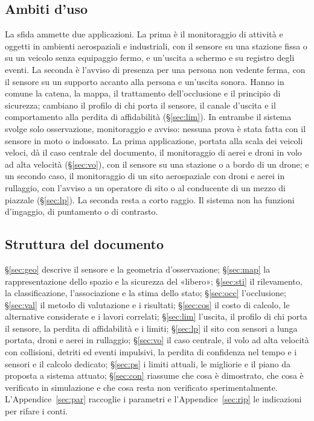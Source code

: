 \subsection{Ambiti d'uso}\label{sec:intro-ambiti}

La sfida ammette due applicazioni. La prima è il monitoraggio di attività e oggetti in ambienti aerospaziali e industriali, con il sensore su una stazione fissa o su un veicolo senza equipaggio fermo, e un'uscita a schermo e su registro degli eventi. La seconda è l'avviso di presenza per una persona non vedente ferma, con il sensore su un supporto accanto alla persona e un'uscita sonora. Hanno in comune la catena, la mappa, il trattamento dell'occlusione e il principio di sicurezza; cambiano il profilo di chi porta il sensore, il canale d'uscita e il comportamento alla perdita di affidabilità (\S\ref{sec:lim}). In entrambe il sistema svolge solo osservazione, monitoraggio e avviso: nessuna prova è stata fatta con il sensore in moto o indossato. La prima applicazione, portata alla scala dei veicoli veloci, dà il caso centrale del documento, il monitoraggio di aerei e droni in volo ad alta velocità (\S\ref{sec:vo}), con il sensore su una stazione o a bordo di un drone; e un secondo caso, il monitoraggio di un sito aerospaziale con droni e aerei in rullaggio, con l'avviso a un operatore di sito o al conducente di un mezzo di piazzale (\S\ref{sec:lp}). La seconda resta a corto raggio. Il sistema non ha funzioni d'ingaggio, di puntamento o di contrasto.

\subsection{Struttura del documento}\label{sec:intro-struttura}

\S\ref{sec:geo} descrive il sensore e la geometria d'osservazione; \S\ref{sec:map} la rappresentazione dello spazio e la sicurezza del «libero»; \S\ref{sec:sti} il rilevamento, la classificazione, l'associazione e la stima dello stato; \S\ref{sec:occ} l'occlusione; \S\ref{sec:val} il metodo di valutazione e i risultati; \S\ref{sec:cos} il costo di calcolo, le alternative considerate e i lavori correlati; \S\ref{sec:lim} l'uscita, il profilo di chi porta il sensore, la perdita di affidabilità e i limiti; \S\ref{sec:lp} il sito con sensori a lunga portata, droni e aerei in rullaggio; \S\ref{sec:vo} il caso centrale, il volo ad alta velocità con collisioni, detriti ed eventi impulsivi, la perdita di confidenza nel tempo e i sensori e il calcolo dedicato; \S\ref{sec:ps} i limiti attuali, le migliorie e il piano da proposta a sistema attuato; \S\ref{sec:con} riassume che cosa è dimostrato, che cosa è verificato in simulazione e che cosa resta non verificato sperimentalmente. L'Appendice~\ref{sec:par} raccoglie i parametri e l'Appendice~\ref{sec:rip} le indicazioni per rifare i conti.
